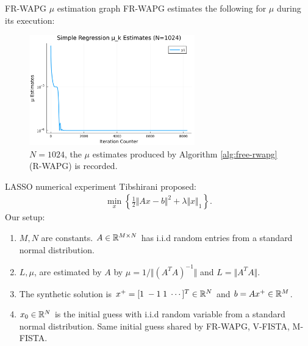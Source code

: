 \documentclass[11pt]{beamer}
\theoremstyle{definition}
\begin{document}
        \begin{frame}{FR-WAPG $\mu$ estimation graph}
            FR-WAPG estimates the following for $\mu$ during its execution: 
            \begin{figure}[H]
                \centering
                \includegraphics[width=0.64\textwidth]{assets/simple_regression_loss_sc_estimates_1024.png}
                \caption{$N = 1024$, the $\mu$ estimates produced by Algorithm \ref{alg:free-rwapg} (R-WAPG) is recorded. }
                \label{fig:simple-quadratic-r-wapg-mu-estimates}
            \end{figure}
        \end{frame}
        \begin{frame}{LASSO numerical experiment}
            Tibshirani \cite{tibshirani_regression_1996} proposed: 
            \begin{align*}
                \min_x
                \left\lbrace
                    \frac{1}{2}\Vert Ax - b\Vert^2 + \lambda\Vert x\Vert_1
                \right\rbrace. 
            \end{align*}
            Our setup: 
            \begin{enumerate}
                \item $M, N$ are constants. $A \in \mathbb R^{M\times N}$ has i.i.d random entries from a standard normal distribution. 
                \item $L, \mu$, are estimated by $A$ by $\mu = 1/\Vert (A^TA)^{-1}\Vert$ and $L = \Vert A^TA\Vert$. 
                \item The synthetic solution is $x^+ = [1\; -1\; 1 \; \cdots ]^T \in \mathbb R^N$ and $b = Ax^+ \in \mathbb R^M$.
                \item $x_0\in \mathbb R^N$ is the initial guess with i.i.d random variable from a standard normal distribution. Same initial guess shared by FR-WAPG, V-FISTA, M-FISTA. 
            \end{enumerate}
        \end{frame}
\end{document}
